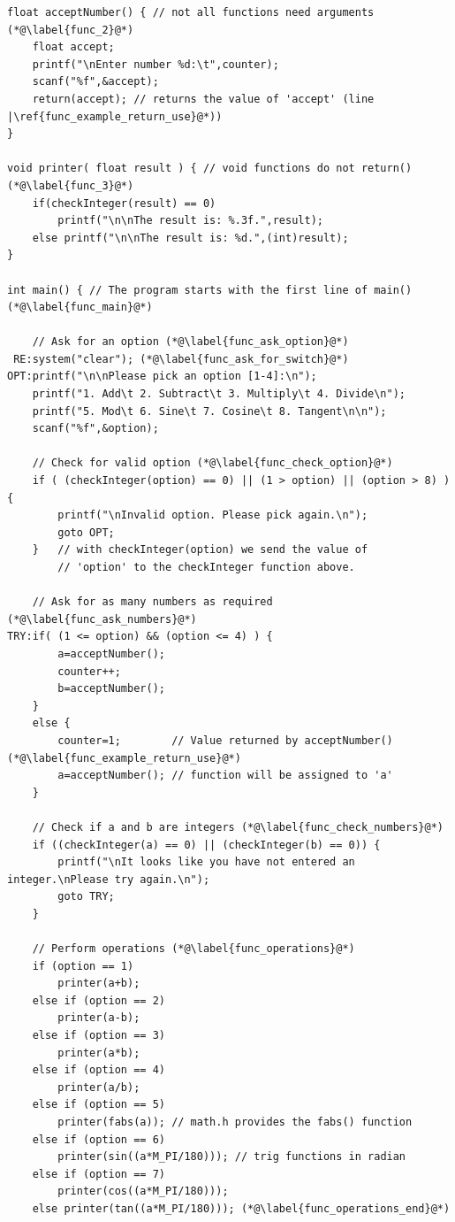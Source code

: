 \documentclass[11pt,oneside]{article}
\begin{document}
{{{{{{{{{\begin{lstlisting}
float acceptNumber() { // not all functions need arguments (*@\label{func_2}@*)
    float accept;
    printf("\nEnter number %d:\t",counter);
    scanf("%f",&accept);
    return(accept); // returns the value of 'accept' (line |\ref{func_example_return_use}@*))
}

void printer( float result ) { // void functions do not return() (*@\label{func_3}@*)
    if(checkInteger(result) == 0)
        printf("\n\nThe result is: %.3f.",result);
    else printf("\n\nThe result is: %d.",(int)result);
}

int main() { // The program starts with the first line of main() (*@\label{func_main}@*)
    
    // Ask for an option (*@\label{func_ask_option}@*)
 RE:system("clear"); (*@\label{func_ask_for_switch}@*)
OPT:printf("\n\nPlease pick an option [1-4]:\n");
    printf("1. Add\t 2. Subtract\t 3. Multiply\t 4. Divide\n");
    printf("5. Mod\t 6. Sine\t 7. Cosine\t 8. Tangent\n\n");
    scanf("%f",&option);
    
    // Check for valid option (*@\label{func_check_option}@*)
    if ( (checkInteger(option) == 0) || (1 > option) || (option > 8) )  {
        printf("\nInvalid option. Please pick again.\n");
        goto OPT;
    }   // with checkInteger(option) we send the value of
        // 'option' to the checkInteger function above.
    
    // Ask for as many numbers as required (*@\label{func_ask_numbers}@*)
TRY:if( (1 <= option) && (option <= 4) ) {
        a=acceptNumber();
        counter++;
        b=acceptNumber();
    }
    else {
        counter=1;        // Value returned by acceptNumber() (*@\label{func_example_return_use}@*)
        a=acceptNumber(); // function will be assigned to 'a'
    }
    
    // Check if a and b are integers (*@\label{func_check_numbers}@*)
    if ((checkInteger(a) == 0) || (checkInteger(b) == 0)) {
        printf("\nIt looks like you have not entered an integer.\nPlease try again.\n");
        goto TRY;
    }
    
    // Perform operations (*@\label{func_operations}@*)
    if (option == 1)
        printer(a+b);
    else if (option == 2)
        printer(a-b);
    else if (option == 3)
        printer(a*b);
    else if (option == 4)
        printer(a/b);
    else if (option == 5)
        printer(fabs(a)); // math.h provides the fabs() function
    else if (option == 6)
        printer(sin((a*M_PI/180))); // trig functions in radian
    else if (option == 7)
        printer(cos((a*M_PI/180)));
    else printer(tan((a*M_PI/180))); (*@\label{func_operations_end}@*)
    

\end{lstlisting}}}}}}}}}}
\end{document}
